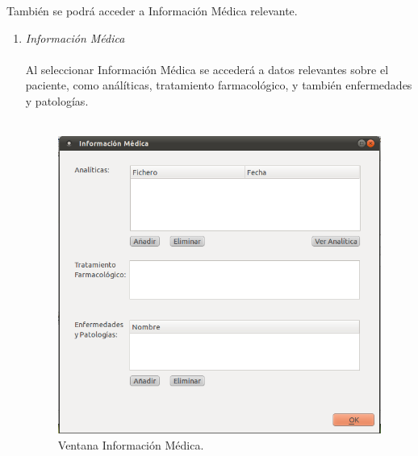 También se podrá acceder a Información Médica relevante.\\
\begin{enumerate}
\item \textit{Información Médica}\\\\
Al seleccionar Información Médica se accederá a datos relevantes sobre el paciente, como análíticas, tratamiento farmacológico, y también enfermedades y patologías.\\\\
\begin{figure}[H]
  \label{infomed}
  \begin{center}
    \includegraphics[scale=0.5]{../../Image/infomed.png}
  \end{center}
  \caption{Ventana Información Médica.}
\end{figure}


\end{enumerate}
